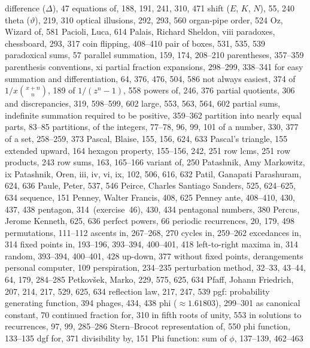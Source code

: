 \sub difference ($\Delta$), 47
\sub equations of, 188, 191, 241, 310, 471
\sub shift ($E$, $K$, $N$), 55, 240
\sub theta ($\vartheta$), 219, 310
optical illusions, 292, 293, 560
organ-pipe order, 524
Oz, Wizard of, 581
\medskip
Pacioli, Luca, 614
Palais, Richard Sheldon, viii
paradoxes,
\sub chessboard, 293, 317
\sub coin flipping, 408--410
\sub pair of boxes, 531, 535, 539
paradoxical sums, 57
parallel summation, 159, 174, 208--210
parentheses, 357--359
parenthesis conventions, xi
partial fraction expansions, 298--299, 338--341
\sub for easy summation and differentiation, 64, 376, 476, 504, 586
\sub not always easiest, 374
\sub of $1/x{x+n\choose n}$, 189
\sub of $1/(z^n-1)$, 558
\sub powers of, 246, 376
partial quotients, 306
\sub and discrepancies, 319, 598--599, 602
\sub large, 553, 563, 564, 602
partial sums, \see indefinite summation
\sub required to be positive, 359--362
partition into nearly equal parts, 83--85
partitions, of the integers, 77--78, 96, 99, 101
\sub of a number, 330, 377
\sub of a set, 258--259, 373
Pascal, Blaise, 155, 156, 624, 633
Pascal's triangle, 155
\sub extended upward, 164
\sub hexagon property, 155--156, 242, 251
\sub row lcms, 251
\sub row products, 243
\sub row sums, 163, 165--166
\sub variant of, 250
Patashnik, Amy Markowitz, ix
Patashnik, Oren, iii, iv, vi, ix, 102, 506, 616, 632
Patil, Ganapati Parashuram, 624, 636
Paule, Peter, 537, 546
Peirce, Charles Santiago Sanders, 525, 624--625, 634
\sub sequence, 151
Penney, Walter Francis, 408, 625
Penney ante, 408--410, 430, 437, 438
pentagon, 314~(exercise~46), 430, 434
pentagonal numbers, 380
Percus, Jerome Kenneth, 625, 636
perfect powers, 66
periodic recurrences, 20, 179, 498
permutations, 111--112
\sub ascents in, 267--268, 270
\sub cycles in, 259--262
\sub excedances in, 314
\sub fixed points in, 193--196, 393--394, 400--401, 418
\sub left-to-right maxima in, 314
\sub random, 393--394, 400--401, 428
\sub up-down, 377
\sub without fixed points, \see derangements
personal computer, 109
perspiration, 234--235
perturbation method, 32--33, 43--44, 64, 179, 284--285
Petkov\v{s}ek, Marko, 229, 575, 625, 634
Pfaff, Johann Friedrich, 207, 214, 217, 529, 625, 634
\sub reflection law, 217, 247, 539
pgf: probability generating function, 394
phages, 434, 438
phi ($\approx1.61803$), 299--301
\sub as canonical constant, 70
\sub continued fraction for, 310
\sub in fifth roots of unity, 553
\sub in solutions to recurrences, 97, 99, 285--286
\sub Stern--Brocot representation of, 550
phi function, 133--135
\sub dgf for, 371
\sub divisibility by, 151
Phi function: sum of $\phi$, 137--139, 462--463
